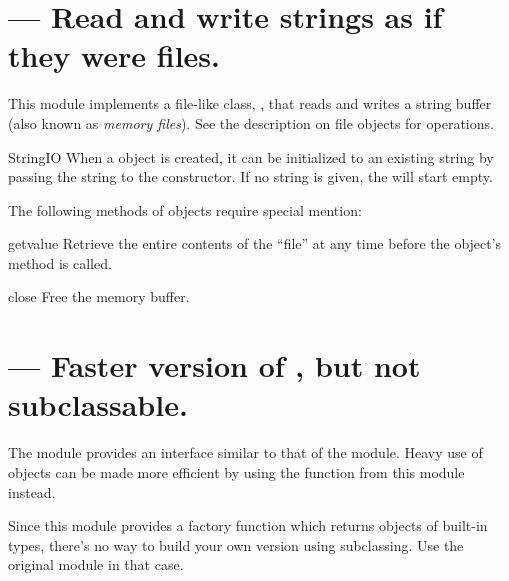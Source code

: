 \section{ ---
         Read and write strings as if they were files.}




This module implements a file-like class, ,
that reads and writes a string buffer (also known as \emph{memory
files}). See the description on file objects for operations.

\begin{classdesc}{StringIO}{}
When a  object is created, it can be initialized
to an existing string by passing the string to the constructor.
If no string is given, the  will start empty.
\end{classdesc}

The following methods of  objects require special
mention:

\begin{methoddesc}{getvalue}{}
Retrieve the entire contents of the ``file'' at any time before the
 object's  method is called.
\end{methoddesc}

\begin{methoddesc}{close}{}
Free the memory buffer.
\end{methoddesc}


\section{ ---
         Faster version of , but not subclassable.}


The module  provides an interface similar to that of
the  module.  Heavy use of 
objects can be made more efficient by using the function
 from this module instead.

Since this module provides a factory function which returns objects of
built-in types, there's no way to build your own version using
subclassing.  Use the original  module in that case.
